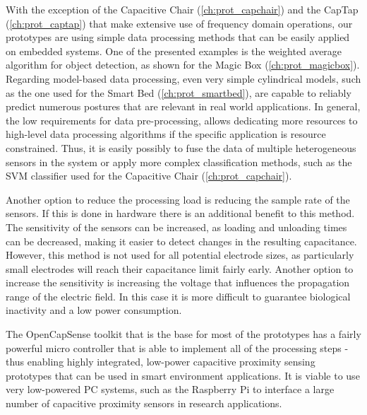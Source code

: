 With the exception of the Capacitive Chair (\ref{ch:prot_capchair}) and the CapTap (\ref{ch:prot_captap}) that make extensive use of frequency domain operations, our prototypes are using simple data processing methods that can be easily applied on embedded systems. One of the presented examples is the weighted average algorithm for object detection, as shown for the Magic Box (\ref{ch:prot_magicbox}). Regarding model-based data processing, even very simple cylindrical models, such as the one used for the Smart Bed (\ref{ch:prot_smartbed}), are capable to reliably predict numerous postures that are relevant in real world applications. In general, the low requirements for data pre-processing, allows dedicating more resources to high-level data processing algorithms if the specific application is resource constrained. Thus, it is easily possibly to fuse the data of multiple heterogeneous sensors in the system or apply more complex classification methods, such as the SVM classifier used for the Capacitive Chair (\ref{ch:prot_capchair}).

Another option to reduce the processing load is reducing the sample rate of the sensors. If this is done in hardware there is an additional benefit to this method. The sensitivity of the sensors can be increased, as loading and unloading times can be decreased, making it easier to detect changes in the resulting capacitance. However, this method is not used for all potential electrode sizes, as particularly small electrodes will reach their capacitance limit fairly early. Another option to increase the sensitivity is increasing the voltage that influences the propagation range of the electric field. In this case it is more difficult to guarantee biological inactivity and a low power consumption.

The OpenCapSense toolkit that is the base for most of the prototypes has a fairly powerful micro controller that is able to implement all of the processing steps - thus enabling highly integrated, low-power capacitive proximity sensing prototypes that can be used in smart environment applications. It is viable to use very low-powered PC systems, such as the Raspberry Pi to interface a large number of capacitive proximity sensors in research applications.
